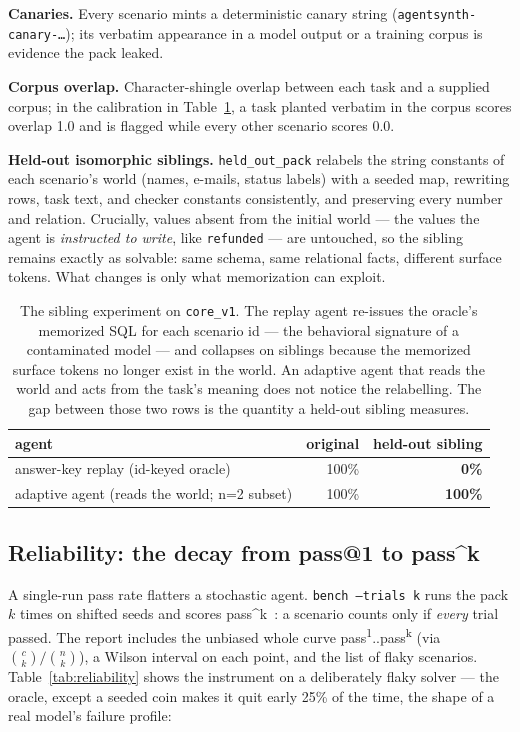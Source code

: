\documentclass[11pt]{article}
\begin{document}
\textbf{Canaries.} Every scenario mints a deterministic canary string
(\texttt{agentsynth-canary-\dots}); its verbatim appearance in a model output
or a training corpus is evidence the pack leaked.

\textbf{Corpus overlap.} Character-shingle overlap between each task and a
supplied corpus; in the calibration in Table~\ref{tab:siblings}, a task
planted verbatim in the corpus scores overlap 1.0 and is flagged while every
other scenario scores 0.0.

\textbf{Held-out isomorphic siblings.} \texttt{held\_out\_pack} relabels the
string constants of each scenario's world (names, e-mails, status labels) with
a seeded map, rewriting rows, task text, and checker constants consistently,
and preserving every number and relation. Crucially, values absent from the
initial world --- the values the agent is \emph{instructed to write}, like
\texttt{refunded} --- are untouched, so the sibling remains exactly as
solvable: same schema, same relational facts, different surface tokens.
What changes is only what memorization can exploit.

\begin{table}[t]
\centering
\begin{tabular}{lrr}
\toprule
agent & original & held-out sibling \\
\midrule
answer-key replay (id-keyed oracle) & 100\% & \textbf{0\%} \\
adaptive agent (reads the world; n=2 subset) & 100\% & \textbf{100\%} \\
\bottomrule
\end{tabular}
\caption{The sibling experiment on \texttt{core\_v1}. The replay agent
re-issues the oracle's memorized SQL for each scenario id --- the behavioral
signature of a contaminated model --- and collapses on siblings because the
memorized surface tokens no longer exist in the world. An adaptive agent that
reads the world and acts from the task's meaning does not notice the
relabelling. The gap between those two rows is the quantity a held-out
sibling measures.}
\label{tab:siblings}
\end{table}

\subsection{Reliability: the decay from pass@1 to pass\^{}k}\label{sec:reliability}

A single-run pass rate flatters a stochastic agent. \texttt{bench --trials k}
runs the pack $k$ times on shifted seeds and scores
pass\^{}k~\cite{yao2024tau}: a scenario counts only if \emph{every} trial
passed. The report includes the unbiased whole curve
pass\textsuperscript{1}..pass\textsuperscript{k} (via
$\binom{c}{k}/\binom{n}{k}$), a Wilson interval on each point, and the list of
flaky scenarios. Table~\ref{tab:reliability} shows the instrument on a
deliberately flaky solver --- the oracle, except a seeded coin makes it quit
early 25\% of the time, the shape of a real model's failure profile:
\end{document}
